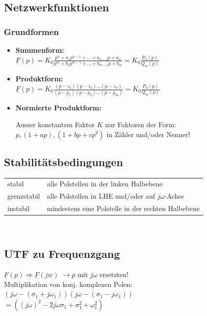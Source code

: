 \begin{multicols}{2}
\subsection{Netzwerkfunktionen}
\subsubsection{Grundformen}
	\begin{itemize}
		\item \textbf{Summenform:}\\
		 $\underline{F}(p) = K_0 \frac{p^n + a_1 p^{n-1} + \ldots + a_{n-1}p + a_n}{p^m+b_1 p^{m-1} + \ldots +b_{m-1}p+b_m} = K_0\frac{P_n(p)}{Q_m(p)}$
		\item \textbf{Produktform:}\\
		 $ \underline{F}(p) = K_0 \frac{(p-z_1)(p-z_2)\ldots(p-z_n)}{(p-p_1)(p-p_2)\ldots(p-p_m)}= K_0\frac{P_n(p)}{Q_m(p)}$
		\item \textbf{Normierte Produktform:}\\ \parbox{8cm}{Ausser konstantem Faktor $K$ nur Faktoren der Form: $p, (1+ap),(1+bp+cp^2)$ in Zähler und/oder Nenner!}
	\end{itemize}
	\columnbreak
\subsection{Stabilitätsbedingungen}
\begin{tabular}{ll}
	stabil & alle Polstellen in der linken Halbebene\\
	grenzstabil & alle Polstellen in LHE und/oder auf
	$j\omega$-Achse\\
	instabil & mindestens eine Polstelle in der rechten Halbebene
\end{tabular}\\


\subsection{UTF zu Frequenzgang}
	$\underline{F}(p) \Rightarrow \underline{F}(jw)$
	$\rightarrow p$ mit $j\omega$ ersetzten!\\
	Multiplikation von konj. komplexen Polen:\\ 
		\hspace*{0.5cm}$(j\omega-(\sigma_1 + j\omega_1))(j\omega-(\sigma_1 - j\omega_1))$ \\ \hspace*{0.5cm}$= ((j\omega)^2-2j\omega\sigma_1+\sigma_1^2 +\omega_1^2)$
\end{multicols}


